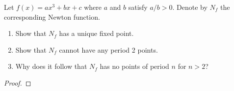 \begin{problem}{6}
  Let $f(x) = ax^3+bx+c$ where $a$ and $b$ satisfy $a/b > 0$. Denote by $N_f$
  the corresponding Newton function.
  \begin{enumerate}
    \item Show that $N_f$ has a unique fixed point.
    \item Show that $N_f$ cannot have any period 2 points.
    \item Why does it follow that $N_f$ has no points of period $n$ for $n>2$?
  \end{enumerate}
\end{problem}

\begin{proof}
\end{proof}
\newpage
